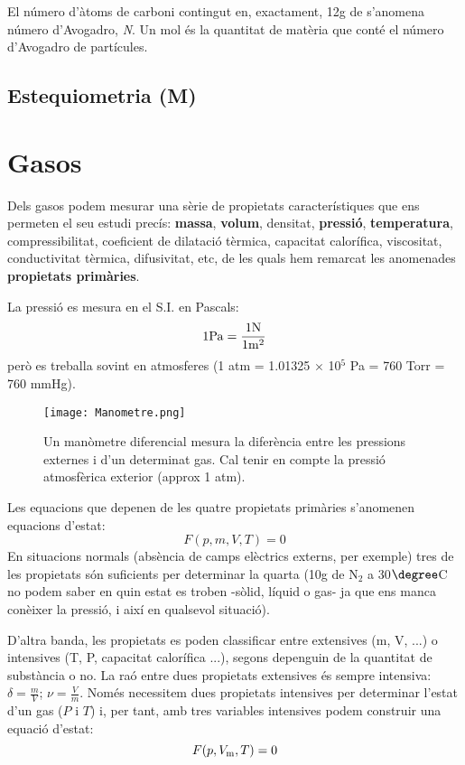\begin{mdframed}[backgroundcolor=gray!30,frametitle=Concepte de mol]
El número d'àtoms de carboni contingut en, exactament, 12g de  s'anomena número d'Avogadro, \emph{N}. Un mol és la quantitat de matèria que conté el número d'Avogadro de partícules.
\end{mdframed}

\newpage

\subsection{Estequiometria (M)}

\section{Gasos}
\label{sec:gasos}

Dels gasos podem mesurar una sèrie de propietats característiques que ens permeten el seu estudi precís: \textbf{massa}, \textbf{volum}, densitat, \textbf{pressió}, \textbf{temperatura}, compressibilitat, coeficient de dilatació tèrmica, capacitat calorífica, viscositat, conductivitat tèrmica, difusivitat, etc, de les quals hem remarcat les anomenades \textbf{propietats primàries}.

La pressió es mesura en el S.I. en Pascals:
\[
1 {\rm Pa}=\frac{1 {\rm N}}{1 {\rm m}^2}
\]
però es treballa sovint en atmosferes (1 atm = 1.01325 $\times$ 10$^5$ Pa = 760 Torr = 760 mmHg).
\begin{figure}[h]
\centering
\texttt{[image: Manometre.png]}
\caption[Manòmetre diferencial]{Un manòmetre diferencial mesura la diferència entre les pressions externes i d'un determinat gas. Cal tenir en compte la pressió atmosfèrica exterior (approx 1 atm).}
\label{fig:Manometre}
\end{figure}
Les equacions que depenen de les quatre propietats primàries s'anomenen equacions d'estat:
\[F(p,m,V,T)=0\]
En situacions normals (absència de camps elèctrics externs, per exemple) tres de les propietats són suficients per determinar la quarta (10g de N$_2$ a 30$\degree$C no podem saber en quin estat es troben -sòlid, líquid o gas- ja que ens manca conèixer la pressió, i així en qualsevol situació).

D'altra banda, les propietats es poden classificar entre extensives (m, V, ...) o intensives (T, P, capacitat calorífica ...), segons depenguin de la quantitat de substància o no. La raó entre dues propietats extensives és sempre intensiva: $\delta = \frac{m}{V}$; $\nu = \frac{V}{m}$. Només necessitem dues propietats intensives per determinar l'estat d'un gas ($P$ i $T$) i, per tant, amb tres variables intensives podem construir una equació d'estat: 
\[F(p,V_{\rm m},T)=0\]

